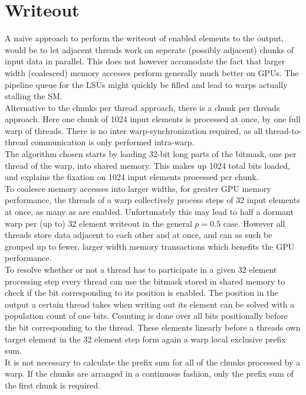 \documentclass{tudscrreprt}
\begin{document}
		\section{Writeout}
			\label{sec:analysis_writeout}
			A naive approach to perform the writeout of enabled elements to the output, would be to let adjacent threads work on seperate (possibly adjacent) chunks of input data in parallel. This does not however accomodate the fact that larger width (coalesced) memory accesses perform generally much better on GPUs. The pipeline queue for the LSUs might quickly be filled and lead to warps actually stalling the SM. \\
			
			Alternative to the chunks per thread approach, there is a chunk per threads approach. Here one chunk of 1024 input elements is processed at once, by one full warp of threads. There is no inter warp-synchronization required, as all thread-to-thread communication is only performed intra-warp. \\
			The algorithm chosen starts by loading 32-bit long parts of the bitmask, one per thread of the warp, into shared memory. This makes up 1024 total bits loaded, and explains the fixation on 1024 input elements processed per chunk. \\
			To coalesce memory accesses into larger widths, for greater GPU memory performance, the threads of a warp collectively process steps of 32 input elements at once, as many as are enabled. Unfortunately this may lead to half a dormant warp per (up to) 32 element writeout in the general $p=0.5$ case. However all threads store data adjacent to each other and at once, and can as such be grouped up to fewer, larger width memory transactions which benefits the GPU performance. \\
			To resolve whether or not a thread has to participate in a given 32 element processing step every thread can use the bitmask stored in shared memory to check if the bit corresponding to its position is enabled. The position in the output a certain thread takes when writing out its element can be solved with a population count of one bits. Counting is done over all bits positionally before the bit corresponding to the thread. These elements linearly before a threads own target element in the 32 element step form again a warp local exclusive prefix sum. \\
			It is not necessary to calculate the prefix sum for all of the chunks processed by a warp. If the chunks are arranged in a continuous fashion, only the prefix sum of the first chunk is required. \\
			
\end{document}
